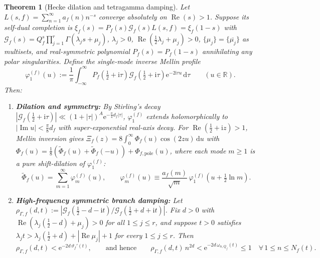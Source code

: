 \documentclass[11pt,reqno]{amsart}
\newtheorem{theorem}{Theorem}[section]
\theoremstyle{definition}
\theoremstyle{remark}
\numberwithin{equation}{section}
\newcommand{\R}{\mathbb{R}}
\newcommand{\dd}{\mathrm{d}}
\newcommand{\ii}{\mathrm{i}}
\newcommand{\ee}{\mathrm{e}}
\DeclareMathOperator{\Reop}{Re}
\DeclareMathOperator{\Imop}{Im}
\begin{document}
\begin{theorem}[Hecke dilation and tetragamma damping]
\label{thm:mother-wavelet}
Let $L(s,f) = \sum_{n=1}^{\infty} a_f(n)n^{-s}$ converge absolutely on $\Reop(s) > 1$. Suppose its self-dual completion is $\xi_f(s) = P_f(s)\mathcal{G}_f(s)L(s,f) = \xi_f(1-s)$ with $\mathcal{G}_f(s) = Q_f^s\prod_{j=1}^{r}\Gamma(\lambda_j s + \mu_j)$, $\lambda_j > 0$, $\Reop(\frac{1}{2}\lambda_j + \mu_j) > 0$, $\{\mu_j\} = \{\overline{\mu_j}\}$ as multisets, and real-symmetric polynomial $P_f(s) = P_f(1-s)$ annihilating any polar singularities. Define the single-mode inverse Mellin profile
\begin{equation}
  \varphi_1^{(f)}(u) := \frac{1}{\pi}\int_{-\infty}^{\infty} P_f\!\left(\tfrac{1}{2} + \ii\tau\right)\mathcal{G}_f\!\left(\tfrac{1}{2} + \ii\tau\right)\ee^{-2\ii\tau u}\,\dd\tau
  \qquad (u \in \R).
  \label{eq:mother-wavelet-def}
\end{equation}
Then:
\begin{enumerate}[label=\textup{(\roman*)},leftmargin=2.2em]
  \item \textbf{Dilation and symmetry:} By Stirling's decay $|\mathcal{G}_f(\frac{1}{2}+\ii\tau)| \ll (1+|\tau|)^A \ee^{-\frac{\pi}{4}d_f|\tau|}$, $\varphi_1^{(f)}$ extends holomorphically to $|\Imop u| < \frac{\pi}{8}d_f$ with super-exponential real-axis decay. For $\Reop(\frac{1}{2}+\ii z) > 1$, Mellin inversion gives $\Xi_f(z) = 8\int_0^\infty \Phi_f(u)\cos(2zu)\,\dd u$ with $\Phi_f(u) = \frac{1}{8}(\widetilde{\Phi}_f(u) + \widetilde{\Phi}_f(-u)) + \Phi_{f,\mathrm{pole}}(u)$, where each mode $m\ge 1$ is a pure shift-dilation of $\varphi_1^{(f)}$:
  \begin{equation}
    \boxed{
    \widetilde{\Phi}_f(u) = \sum_{m=1}^{\infty} \varphi_m^{(f)}(u),
    \qquad
    \varphi_m^{(f)}(u) \equiv \frac{a_f(m)}{\sqrt{m}}\,\varphi_1^{(f)}\!\left(u + \tfrac{1}{2}\ln m\right).
    }
    \label{eq:boxed-mother-wavelet}
  \end{equation}
  \item \textbf{High-frequency symmetric branch damping:} Let $\rho_{\Gamma,f}(d,t) := |\mathcal{G}_f(\frac{1}{2}-d-\ii t)/\mathcal{G}_f(\frac{1}{2}+d+\ii t)|$. Fix $d > 0$ with $\Reop(\lambda_j(\frac{1}{2}-d)+\mu_j) > 0$ for all $1\le j\le r$, and suppose $t > 0$ satisfies $\lambda_j t > \lambda_j(\frac{1}{2}+d) + |\Reop\mu_j| + 1$ for every $1\le j\le r$. Then
  \begin{equation}
    \rho_{\Gamma,f}(d,t) < \ee^{-2d\,\vartheta_f'(t)},
    \qquad\text{and hence}\qquad
    \rho_{\Gamma,f}(d,t)\,n^{2d} < \ee^{-2d\,\omega_{n,Q_f}(t)} \le 1
    \quad \forall\,1 \le n \le N_f(t).
    \label{eq:branch-damping}
  \end{equation}
\end{enumerate}
\end{theorem}
\end{document}
